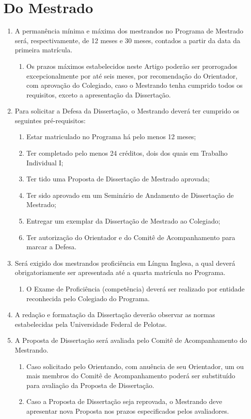 \documentclass{article}
\newcommand{\singleitem}{\item[Parágrafo Único.]}
\begin{document}
\section{Do Mestrado}
\begin{enumerate}
	\item A permanência mínima e máxima dos mestrandos no Programa de Mestrado será, respectivamente, de 12 meses e 30 meses, contados a partir da data da primeira matrícula.
	\begin{enumerate}
		\singleitem Os prazos máximos estabelecidos neste Artigo poderão ser prorrogados excepcionalmente por até seis meses, por recomendação do Orientador, com aprovação do Colegiado, caso o Mestrando tenha cumprido todos os requisitos, exceto a apresentação da Dissertação.
	\end{enumerate}

	\item Para solicitar a Defesa da Dissertação, o Mestrando deverá ter cumprido os seguintes pré-requisitos:
	\begin{enumerate}[label=\Roman*]
		\item Estar matriculado no Programa há pelo menos 12 meses;
		\item 	Ter completado pelo menos 24 créditos, dois dos quais em Trabalho Individual I;
		\item 	Ter tido uma Proposta de Dissertação de Mestrado aprovada;
		\item 	Ter sido aprovado em um Seminário de Andamento de Dissertação de Mestrado;
		\item 	Entregar um exemplar da Dissertação de Mestrado ao Colegiado;
		\item 	Ter autorização do Orientador e do Comitê de Acompanhamento para marcar a Defesa.
	\end{enumerate}

	\item Será exigido dos mestrandos proficiência em Língua Inglesa, a qual deverá obrigatoriamente ser apresentada até a quarta matrícula no Programa.
	\begin{enumerate}
		\singleitem O Exame de Proficiência (competência) deverá ser realizado por entidade reconhecida pelo Colegiado do Programa.
	\end{enumerate}

	\item A redação e formatação da Dissertação deverão observar as normas estabelecidas pela Universidade Federal de Pelotas.

	\item A Proposta de Dissertação será avaliada pelo Comitê de Acompanhamento do Mestrando.
	\begin{enumerate}
		\item Caso solicitado pelo Orientando, com anuência de seu Orientador, um ou mais membros do Comitê de Acompanhamento poderá ser substituído para avaliação da Proposta de Dissertação.
		\item Caso a Proposta de Dissertação seja reprovada, o Mestrando deve apresentar nova Proposta nos prazos especificados pelos avaliadores.
	\end{enumerate}


\end{enumerate}
\end{document}
